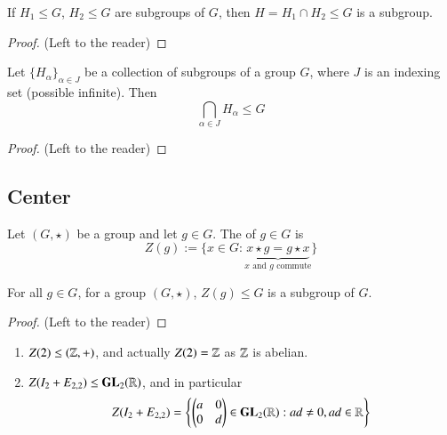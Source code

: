 \documentclass[12pt, a4paper, oneside, openright, titlepage]{book}
\begin{document}
\begin{prop}
    If $H_1 \leq G$, $H_2 \leq G$ are subgroups of $G$, then $H = H_1 \cap H_2 \leq G$ is a subgroup.
    \begin{proof}
        (Left to the reader)
    \end{proof}
\end{prop}

\begin{cor}
    Let $\{H_{\alpha}\}_{\alpha \in J}$ be a collection of subgroups of a group $G$, where $J$ is an indexing set (possible infinite). Then \begin{equation}
        \bigcap_{\alpha \in J}H_{\alpha} \leq G
    \end{equation}
    \begin{proof}
        (Left to the reader)
    \end{proof}
\end{cor}

\subsection{\textsection Center}

\begin{defn}
    Let $(G,\star)$ be a group and let $g \in G$. The  of $g \in G$ is \begin{equation}
        Z(g) := \{x \in G: \underbrace{x\star g = g \star x}_{x\text{ and }g\text{ commute}}\}
    \end{equation}
\end{defn}

\begin{claim}
    For all $g \in G$, for a group $(G,\star)$, $Z(g) \leq G$ is a subgroup of $G$.
    \begin{proof}
        (Left to the reader)
    \end{proof}
\end{claim}

\begin{eg}
    \leavevmode
    \begin{enumerate}
        \item $Z(2) \leq (\mathbb Z,+)$, and actually $Z(2) = \mathbb Z$ as $\mathbb Z$ is abelian.
        \item $Z(I_2 + E_{2,2}) \leq \mathbf{GL}_2(\mathbb R)$, and in particular $$Z(I_2+E_{2,2}) = \left\{\begin{pmatrix} a & 0 \\ 0 & d \end{pmatrix} \in \mathbf{GL}_2(\mathbb R):ad \neq 0, ad\in \mathbb R\right\}$$
    \end{enumerate}
\end{eg}
\end{document}
